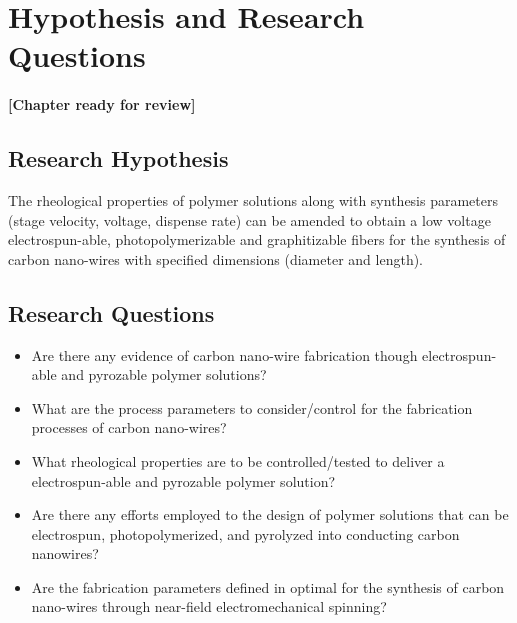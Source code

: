
\chapter{Hypothesis and Research Questions} %

\label{Chapter:HypothesisandResearchQuestions}

\subsubsection*{\color{mygray}[Chapter ready for review]}

\section{Research Hypothesis}

The rheological properties of polymer solutions along with synthesis parameters (stage velocity, voltage, dispense rate) can be amended to obtain a low voltage electrospun-able, photopolymerizable and graphitizable fibers for the synthesis of carbon nano-wires with specified dimensions (diameter and length).

\section{Research Questions}

\begin{itemize}
	\item{
	Are there any evidence of carbon nano-wire fabrication though electrospun-able and pyrozable polymer solutions?
	}
	\item{
	What are the process parameters to consider/control for the fabrication processes of carbon nano-wires? 
	}
	\item{
	What rheological properties are to be controlled/tested to deliver a electrospun-able and pyrozable polymer solution?	
	}
	\item{
	Are there any efforts employed to the design of polymer solutions that can be electrospun, photopolymerized, and pyrolyzed into conducting carbon nanowires?
	}
	\item{
	Are the fabrication parameters defined in \cite{Cardenas2017} optimal for the synthesis of carbon nano-wires through near-field electromechanical spinning?	
	}
\end{itemize}





